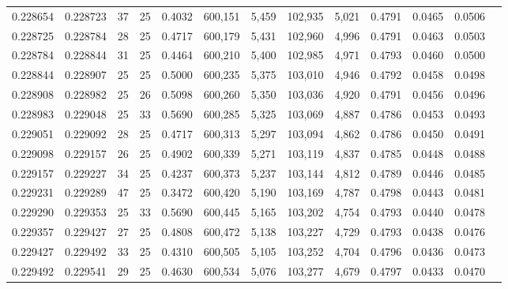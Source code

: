 \begin{tabular}{rrrrrrrrrrrrr}
0.228654 & 0.228723 &  37 &  25 &                                     0.4032 & 600,151 &   5,459 & 102,935 &   5,021 & 0.4791 & 0.0465 & 0.0506 \\
0.228725 & 0.228784 &  28 &  25 &                                     0.4717 & 600,179 &   5,431 & 102,960 &   4,996 & 0.4791 & 0.0463 & 0.0503 \\
0.228784 & 0.228844 &  31 &  25 &                                     0.4464 & 600,210 &   5,400 & 102,985 &   4,971 & 0.4793 & 0.0460 & 0.0500 \\
0.228844 & 0.228907 &  25 &  25 &                                     0.5000 & 600,235 &   5,375 & 103,010 &   4,946 & 0.4792 & 0.0458 & 0.0498 \\
0.228908 & 0.228982 &  25 &  26 &                                     0.5098 & 600,260 &   5,350 & 103,036 &   4,920 & 0.4791 & 0.0456 & 0.0496 \\
0.228983 & 0.229048 &  25 &  33 &                                     0.5690 & 600,285 &   5,325 & 103,069 &   4,887 & 0.4786 & 0.0453 & 0.0493 \\
0.229051 & 0.229092 &  28 &  25 &                                     0.4717 & 600,313 &   5,297 & 103,094 &   4,862 & 0.4786 & 0.0450 & 0.0491 \\
0.229098 & 0.229157 &  26 &  25 &                                     0.4902 & 600,339 &   5,271 & 103,119 &   4,837 & 0.4785 & 0.0448 & 0.0488 \\
0.229157 & 0.229227 &  34 &  25 &                                     0.4237 & 600,373 &   5,237 & 103,144 &   4,812 & 0.4789 & 0.0446 & 0.0485 \\
0.229231 & 0.229289 &  47 &  25 &                                     0.3472 & 600,420 &   5,190 & 103,169 &   4,787 & 0.4798 & 0.0443 & 0.0481 \\
0.229290 & 0.229353 &  25 &  33 &                                     0.5690 & 600,445 &   5,165 & 103,202 &   4,754 & 0.4793 & 0.0440 & 0.0478 \\
0.229357 & 0.229427 &  27 &  25 &                                     0.4808 & 600,472 &   5,138 & 103,227 &   4,729 & 0.4793 & 0.0438 & 0.0476 \\
0.229427 & 0.229492 &  33 &  25 &                                     0.4310 & 600,505 &   5,105 & 103,252 &   4,704 & 0.4796 & 0.0436 & 0.0473 \\
0.229492 & 0.229541 &  29 &  25 &                                     0.4630 & 600,534 &   5,076 & 103,277 &   4,679 & 0.4797 & 0.0433 & 0.0470 \\

\end{tabular}
